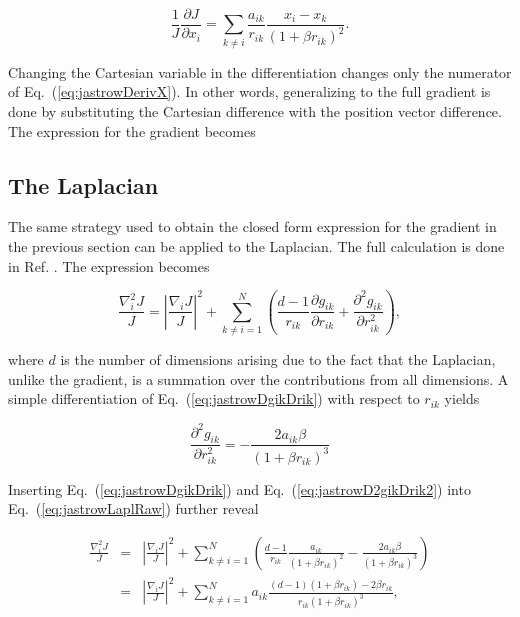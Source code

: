 \begin{equation}
\label{eq:jastrowDerivX}
 \frac{1}{J}\frac{\partial J}{\partial x_i} = \sum_{k \ne i} \frac{a_{ik}}{r_{ik}}\frac{x_i - x_k}{(1 + \beta r_{ik})^2}.
\end{equation}

Changing the Cartesian variable in the differentiation changes only the numerator of Eq.~(\ref{eq:jastrowDerivX}). In other words, generalizing to the full gradient is done by substituting the Cartesian difference with the position vector difference. The expression for the gradient becomes



\subsection{The Laplacian}

The same strategy used to obtain the closed form expression for the gradient in the previous section can be applied to the Laplacian. The full calculation is done in Ref. \cite{morten}. The expression becomes

\begin{equation}
\label{eq:jastrowLaplRaw}
 \frac{\nabla^2_i J}{J} = \left| \frac{\nabla_i J}{J}\right|^2 + \sum_{k \ne i = 1}^N \left(\frac{d-1}{r_{ik}}\frac{\partial g_{ik}}{\partial r_{ik}} + \frac{\partial^2 g_{ik}}{\partial r_{ik}^2}\right), 
\end{equation}

where $d$ is the number of dimensions arising due to the fact that the Laplacian, unlike the gradient, is a summation over the contributions from all dimensions. A simple differentiation of Eq.~(\ref{eq:jastrowDgikDrik}) with respect to $r_{ik}$ yields

\begin{equation}
\label{eq:jastrowD2gikDrik2}
 \frac{\partial^2 g_{ik}}{\partial r_{ik}^2} = -\frac{2a_{ik}\beta}{(1 + \beta r_{ik})^3}
\end{equation}

Inserting Eq.~(\ref{eq:jastrowDgikDrik}) and Eq.~(\ref{eq:jastrowD2gikDrik2}) into Eq.~(\ref{eq:jastrowLaplRaw}) further reveal

\begin{eqnarray}
 \frac{\nabla^2_i J}{J} &=& \left| \frac{\nabla_i J}{J}\right|^2 + \sum_{k \ne i = 1}^N \left(\frac{d-1}{r_{ik}}\frac{a_{ik}}{(1 + \beta r_{ik})^2} - \frac{2a_{ik}\beta}{(1 + \beta r_{ik})^3}\right) \nonumber\\
  &=& \left| \frac{\nabla_i J}{J}\right|^2 + \sum_{k \ne i = 1}^N a_{ik}\frac{(d-1)(1 + \beta r_{ik}) - 2\beta r_{ik}}{r_{ik}(1 + \beta r_{ik})^3}, \nonumber
\end{eqnarray}

